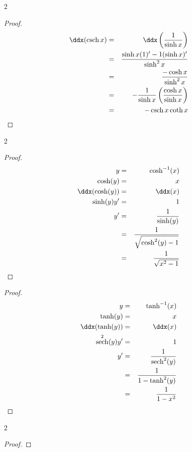\documentclass{book}
\DeclareMathOperator{\sech}{sech}
\DeclareMathOperator{\csch}{csch}
\begin{document}
\begin{appendices}
\begin{enumerate}[!HW!]
\begin{multicols}{2}
\begin{proof}
\begin{eqnarray*}
\ddx(\csch x) &=& \ddx\left(\dfrac{1}{\sinh x}\right)\\ &=& \dfrac{\sinh x(1)' - 1(\sinh x)'}{\sinh^2 x}\\ &=& \dfrac{-\cosh x}{\sinh^2 x} \\ &=& -\dfrac{1}{\sinh x}\left(\dfrac{\cosh x}{\sinh x}\right)\\ &=& -\csch x\coth x 
\end{eqnarray*}
\end{proof} 
\end{multicols}

\begin{multicols}{2}
\itemspade \begin{proof}\mbox{}\vspace{-35pt}

\begin{eqnarray*}
y &=& \cosh^{-1}(x)\\
\cosh(y) &=& x\\
\ddx(\cosh(y)) &=& \ddx(x)\\
\sinh(y)y' &=&1\\
y' &=& \dfrac{1}{\sinh(y)}\\ & =& \dfrac{1}{\sqrt{\cosh^2(y)-1}}\\ &=& \dfrac{1}{\sqrt{x^2-1}}
\end{eqnarray*}
\end{proof} \columnbreak

\itemspade \begin{proof}\mbox{}\vspace{-35pt}

\begin{eqnarray*}
y &=& \tanh^{-1}(x)\\
\tanh(y) &=& x\\
\ddx(\tanh(y)) &=& \ddx(x)\\
\sech^2(y)y' &=&1\\
y' &=& \dfrac{1}{\sech^2(y)}\\ &=& \dfrac{1}{1-\tanh^2(y)} \\&=& \dfrac{1}{1-x^2}
\end{eqnarray*}
\end{proof}
\end{multicols}

\begin{multicols}{2}
\item \begin{proof}\mbox{}\vspace{-35pt}


\end{proof}
\end{multicols}
\end{enumerate}
\end{appendices}
\end{document}
